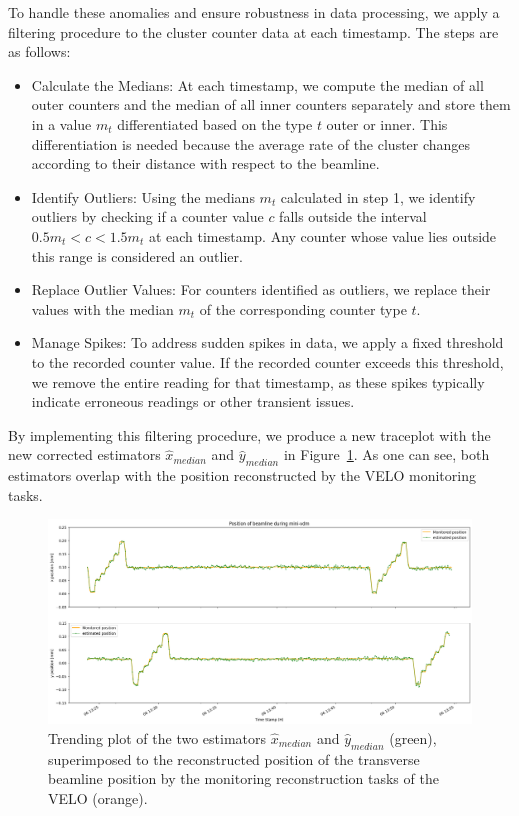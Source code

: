 To handle these anomalies and ensure robustness in data processing, we apply a filtering procedure to the cluster counter data at each timestamp. The steps are as follows:
\begin{itemize}
    \item Calculate the Medians: At each timestamp, we compute the median of all outer counters and the median of all inner counters separately and store them in a value $m_t$ differentiated based on the type $t$ outer or inner. This differentiation is needed because the average rate of the cluster changes according to their distance with respect to the beamline.
    \item Identify Outliers: Using the medians $m_t$ calculated in step 1, we identify outliers by checking if a counter value $c$ falls outside the interval $0.5 m_t < c < 1.5 m_t$ at each timestamp. Any counter whose value lies outside this range is considered an outlier.
    \item Replace Outlier Values: For counters identified as outliers, we replace their values with the median $m_t$ of the corresponding counter type $t$.
    \item Manage Spikes: To address sudden spikes in data, we apply a fixed threshold to the recorded counter value. If the recorded counter exceeds this threshold, we remove the entire reading for that timestamp, as these spikes typically indicate erroneous readings or other transient issues.
\end{itemize}

By implementing this filtering procedure, we produce a new traceplot with the new corrected estimators $\hat{x}_{median}$ and $\hat{y}_{median}$ in Figure~\ref{fig:traceplot_off}. As one can see, both estimators overlap with the position reconstructed by the VELO monitoring tasks. 

\begin{figure}
    \centering
    \includegraphics[width=\textwidth]{figures/traceplot_zoom.png}
    \caption{Trending plot of the two estimators $\hat{x}_{median}$ and $\hat{y}_{median}$ (green), superimposed to the reconstructed position of the transverse beamline position by the monitoring reconstruction tasks of the VELO (orange).}
    \label{fig:traceplot_off}
\end{figure}

